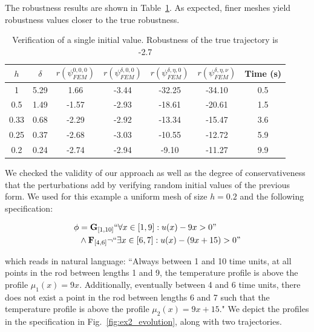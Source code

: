 \documentclass{article}
\newcommand{\Always}{\mathbf{G}}
\newcommand{\Event}{\mathbf{F}}
\begin{document}
The robustness results are shown in Table~\ref{tab:res_meshes}. As expected, finer meshes
yield robustness values closer to the true robustness.

\begin{table}
\centering
\begin{tabular}{|c|c|c|c|c|c|c|}
    \hline
    $h$ & $\delta$ & $r(\psi_{FEM}^{0, 0, 0})$ & $r(\psi_{FEM}^{\delta, 0, 0})$ &
    $r(\psi_{FEM}^{\delta, \eta, 0})$ & $r(\psi_{FEM}^{\delta, \eta,
\nu})$ & Time (s)  \\
    \hline
    1 & 5.29 & 1.66 & -3.44 & -32.25 & -34.10 & 0.5 \\
    0.5 & 1.49 & -1.57 & -2.93 & -18.61 & -20.61 & 1.5 \\
    0.33 & 0.68 & -2.29 & -2.92 & -13.34 & -15.47 & 3.6 \\
    0.25 & 0.37 & -2.68 & -3.03 & -10.55 & -12.72 & 5.9 \\
    0.2 & 0.24 & -2.74 & -2.94 & -9.10 & -11.27 & 9.9 \\
    \hline
\end{tabular}
\caption{Verification of a single initial value. Robustness of the true
trajectory is -2.7}
\label{tab:res_meshes}
\end{table}

We checked the validity of our approach as well as the degree of
conservativeness that the perturbations add by verifying random initial values
of the previous form. We used for this example a uniform mesh of size $h = 0.2$
and the following specification: 

\begin{equation}
    \begin{aligned}
        \phi &= \Always_{[1, 10]} ``\forall x \in [1, 9]: u(x) - 9x > 0" \\
        &\wedge \Event_{[4, 6]} \lnot ``\exists x \in [6, 7]: u(x) - (9x + 15) > 0"
\end{aligned}
\end{equation}

which reads in natural language: ``Always between 1 and 10 time units, at all
points in the rod between lengths 1 and 9, the temperature profile is above the
profile $\mu_1(x) = 9x$. Additionally, eventually between 4 and 6 time units,
there does not exist a point in the rod between lengths 6 and 7 such that the
temperature profile is above the profile $\mu_2(x) = 9x + 15$." We depict the
profiles in the specification in Fig.~\ref{fig:ex2_evolution}, along with two
trajectories.
\end{document}
